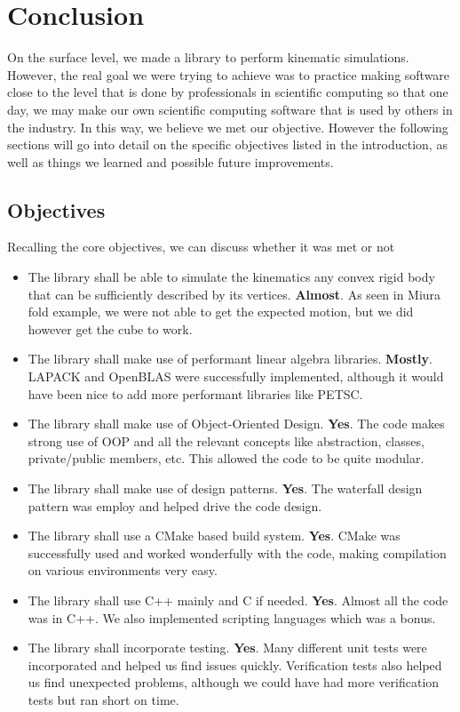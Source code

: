 \newpage
\section{Conclusion}
On the surface level, we made a library to perform kinematic simulations. However, the real goal we were trying to achieve was to practice making software close to the level that is done by professionals in scientific computing so that one day, we may make our own scientific computing software that is used by others in the industry. In this way, we believe we met our objective. However the following sections will go into detail on the specific objectives listed in the introduction, as well as things we learned and possible future improvements.
\subsection{Objectives}
Recalling the core objectives, we can discuss whether it was met or not
\begin{itemize}
    \item The library shall be able to simulate the kinematics any convex rigid body that can be sufficiently described by its vertices. \textbf{Almost}. As seen in Miura fold example, we were not able to get the expected motion, but we did however get the cube to work.
    \item The library shall make use of performant linear algebra libraries. \textbf{Mostly}. LAPACK and OpenBLAS were successfully implemented, although it would have been nice to add more performant libraries like PETSC.
    \item The library shall make use of Object-Oriented Design. \textbf{Yes}. The code makes strong use of OOP and all the relevant concepts like abstraction, classes, private/public members, etc. This allowed the code to be quite modular.
    \item The library shall make use of design patterns. \textbf{Yes}. The waterfall design pattern was employ and helped drive the code design.
    \item The library shall use a CMake based build system. \textbf{Yes}. CMake was successfully used and worked wonderfully with the code, making compilation on various environments very easy.
    \item The library shall use C++ mainly and C if needed. \textbf{Yes}. Almost all the code was in C++. We also implemented scripting languages which was a bonus.
    \item The library shall incorporate testing. \textbf{Yes}. Many different unit tests were incorporated and helped us find issues quickly. Verification tests also helped us find unexpected problems, although we could have had more verification tests but ran short on time.

\end{itemize}

